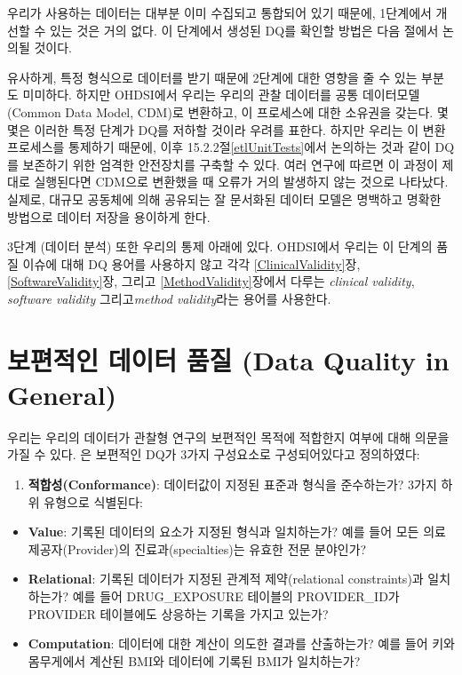 \documentclass[11pt]{book}
\providecommand{\tightlist}{%
  \setlength{\itemsep}{0pt}\setlength{\parskip}{0pt}}
\theoremstyle{definition}
\theoremstyle{definition}
\theoremstyle{definition}
\theoremstyle{remark}
\begin{document}
우리가 사용하는 데이터는 대부분 이미 수집되고 통합되어 있기 때문에,
1단계에서 개선할 수 있는 것은 거의 없다. 이 단계에서 생성된 DQ를 확인할
방법은 다음 절에서 논의될 것이다.

유사하게, 특정 형식으로 데이터를 받기 때문에 2단계에 대한 영향을 줄 수
있는 부분도 미미하다. 하지만 OHDSI에서 우리는 우리의 관찰 데이터를 공통
데이터모델(Common Data Model, CDM)로 변환하고, 이 프로세스에 대한
소유권을 갖는다. 몇몇은 이러한 특정 단계가 DQ를 저하할 것이라 우려를
표한다. 하지만 우리는 이 변환 프로세스를 통제하기 때문에, 이후
15.2.2절\ref{etlUnitTests}에서 논의하는 것과 같이 DQ를 보존하기 위한
엄격한 안전장치를 구축할 수 있다. 여러
연구\citep{defalco_2013, makadia_2014, matcho_2014, voss_2015, voss_2015b, hripcsak_2018}에
따르면 이 과정이 제대로 실행된다면 CDM으로 변환했을 때 오류가 거의
발생하지 않는 것으로 나타났다. 실제로, 대규모 공동체에 의해 공유되는 잘
문서화된 데이터 모델은 명백하고 명확한 방법으로 데이터 저장을 용이하게
한다.

3단계 (데이터 분석) 또한 우리의 통제 아래에 있다. OHDSI에서 우리는 이
단계의 품질 이슈에 대해 DQ 용어를 사용하지 않고 각각
\ref{ClinicalValidity}장, \ref{SoftwareValidity}장, 그리고
\ref{MethodValidity}장에서 다루는 \emph{clinical validity},
\emph{software validity} 그리고\emph{method validity}라는 용어를
사용한다.

\section{보편적인 데이터 품질 (Data Quality in
General)}\label{---data-quality-in-general}

우리는 우리의 데이터가 관찰형 연구의 보편적인 목적에 적합한지 여부에
대해 의문을 가질 수 있다. \citet{kahn_harmonized_2016} 은 보편적인 DQ가
3가지 구성요소로 구성되어있다고 정의하였다:

\begin{enumerate}
\def\labelenumi{\arabic{enumi}.}
\tightlist
\item
  \textbf{적합성(Conformance)}: 데이터값이 지정된 표준과 형식을
  준수하는가? 3가지 하위 유형으로 식별된다:
\end{enumerate}

\begin{itemize}
\tightlist
\item
  \textbf{Value}: 기록된 데이터의 요소가 지정된 형식과 일치하는가? 예를
  들어 모든 의료 제공자(Provider)의 진료과(specialties)는 유효한 전문
  분야인가?
\item
  \textbf{Relational}: 기록된 데이터가 지정된 관계적 제약(relational
  constraints)과 일치하는가? 예를 들어 DRUG\_EXPOSURE 테이블의
  PROVIDER\_ID가 PROVIDER 테이블에도 상응하는 기록을 가지고 있는가?
\item
  \textbf{Computation}: 데이터에 대한 계산이 의도한 결과를 산출하는가?
  예를 들어 키와 몸무게에서 계산된 BMI와 데이터에 기록된 BMI가
  일치하는가?
\end{itemize}
\end{document}
